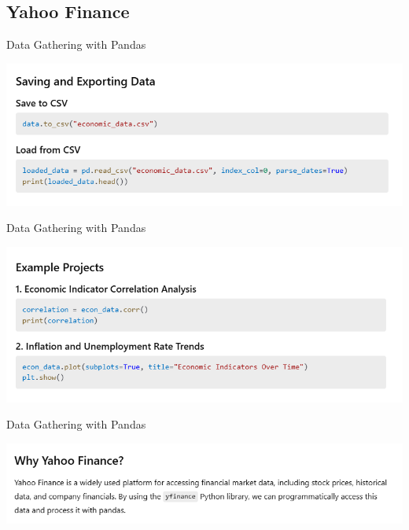 \documentclass[11pt]{beamer}
\begin{document}
\subsection{Yahoo Finance \\ }
\begin{frame}{Data Gathering with Pandas}
	\begin{center}
	\includegraphics[scale=0.55]{../05-pictures/lesson-1-3_pic_9.png}
	\end{center}
\end{frame}
\begin{frame}{Data Gathering with Pandas}
	\begin{center}
	\includegraphics[scale=0.55]{../05-pictures/lesson-1-3_pic_10.png}
	\end{center}
\end{frame}
\begin{frame}{Data Gathering with Pandas}
	\begin{center}
	\includegraphics[scale=0.55]{../05-pictures/lesson-1-3_pic_11.png}
	\end{center}
\end{frame}
\end{document}
